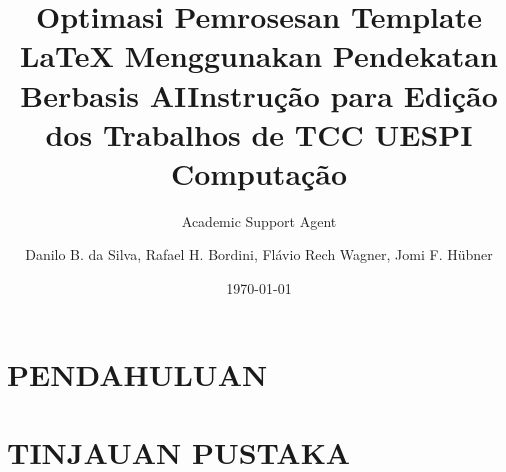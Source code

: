 \documentclass{article}
\title{Optimasi Pemrosesan Template LaTeX Menggunakan Pendekatan Berbasis AI}
\author{Academic Support Agent}
\date{\today}
\begin{document}
\maketitle

\begin{abstract}

\end{abstract}

\chapter{PENDAHULUAN}


\chapter{TINJAUAN PUSTAKA}



\usepackage{sbc-template}
\usepackage{graphicx,url}
\usepackage[brazil]{babel}
\usepackage[utf8x]{inputenc}  
\pagestyle{plain} 
\usepackage{graphicx,url}
\usepackage[utf8x]{inputenc}
\usepackage[brazil]{babel}
\usepackage{comment}
\usepackage{amsmath}
\usepackage{amssymb}
\usepackage{enumerate}
\usepackage{subcaption}
\usepackage[backref=page]{hyperref}
\hypersetup{
    colorlinks=true,
    allcolors=blue,
}
 
\usepackage[alf]{abntex2cite}

\sloppy

\title{Instrução para Edição dos Trabalhos de TCC UESPI Computação}

\author{Danilo B. da Silva, Rafael H. Bordini, Flávio Rech
  Wagner, Jomi F. Hübner }


\address{
Ciência da Computação -- Universidade Estadual do Piauí
  (UESPI)\\
  Floriano -- PI -- Brasil
\nextinstitute
  Department of Computer Science -- University of Durham\\
  Durham, U.K.
\nextinstitute
  Departamento de Sistemas e Computação\\
  Universidade Regional de Blumenal (FURB) -- Blumenau, SC -- Brazil
}
\end{document}

